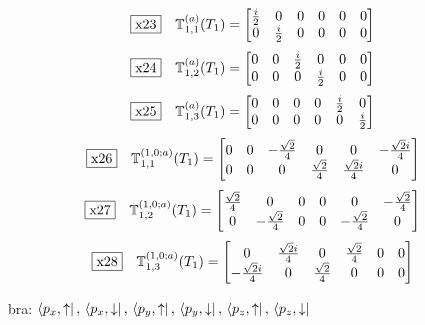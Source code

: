 \documentclass[fleqn,10pt,landscape]{jsarticle}
\begin{document}
\begin{dmath*}
\fbox{x23}\quad \mathbb{T}_{1,1}^{(a)}(T_{1})=\begin{bmatrix} \frac{i}{2} & 0 & 0 & 0 & 0 & 0 \\ 0 & \frac{i}{2} & 0 & 0 & 0 & 0 \end{bmatrix}
\end{dmath*}
\begin{dmath*}
\fbox{x24}\quad \mathbb{T}_{1,2}^{(a)}(T_{1})=\begin{bmatrix} 0 & 0 & \frac{i}{2} & 0 & 0 & 0 \\ 0 & 0 & 0 & \frac{i}{2} & 0 & 0 \end{bmatrix}
\end{dmath*}
\begin{dmath*}
\fbox{x25}\quad \mathbb{T}_{1,3}^{(a)}(T_{1})=\begin{bmatrix} 0 & 0 & 0 & 0 & \frac{i}{2} & 0 \\ 0 & 0 & 0 & 0 & 0 & \frac{i}{2} \end{bmatrix}
\end{dmath*}
\begin{dmath*}
\fbox{x26}\quad \mathbb{T}_{1,1}^{(1,0;a)}(T_{1})=\begin{bmatrix} 0 & 0 & - \frac{\sqrt{2}}{4} & 0 & 0 & - \frac{\sqrt{2} i}{4} \\ 0 & 0 & 0 & \frac{\sqrt{2}}{4} & \frac{\sqrt{2} i}{4} & 0 \end{bmatrix}
\end{dmath*}
\begin{dmath*}
\fbox{x27}\quad \mathbb{T}_{1,2}^{(1,0;a)}(T_{1})=\begin{bmatrix} \frac{\sqrt{2}}{4} & 0 & 0 & 0 & 0 & - \frac{\sqrt{2}}{4} \\ 0 & - \frac{\sqrt{2}}{4} & 0 & 0 & - \frac{\sqrt{2}}{4} & 0 \end{bmatrix}
\end{dmath*}
\begin{dmath*}
\fbox{x28}\quad \mathbb{T}_{1,3}^{(1,0;a)}(T_{1})=\begin{bmatrix} 0 & \frac{\sqrt{2} i}{4} & 0 & \frac{\sqrt{2}}{4} & 0 & 0 \\ - \frac{\sqrt{2} i}{4} & 0 & \frac{\sqrt{2}}{4} & 0 & 0 & 0 \end{bmatrix}
\end{dmath*}
\vspace{5mm}

\noindent\textbullet\, bra: $\bra{p_{x},\uparrow},\, \bra{p_{x},\downarrow},\, \bra{p_{y},\uparrow},\, \bra{p_{y},\downarrow},\, \bra{p_{z},\uparrow},\, \bra{p_{z},\downarrow}$
\end{document}
